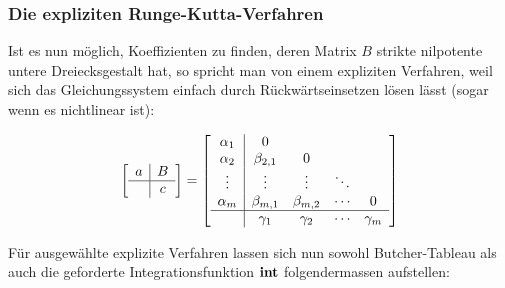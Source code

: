\documentclass[11pt]{report} %
\theoremstyle{definition}
\begin{document}
\subsubsection{Die expliziten Runge-Kutta-Verfahren}

Ist es nun möglich, Koeffizienten zu finden, deren Matrix $B$ strikte nilpotente untere Dreiecksgestalt hat, so spricht man von einem expliziten Verfahren, weil sich das Gleichungssystem einfach durch Rückwärtseinsetzen lösen lässt (sogar wenn es nichtlinear ist):

\[
\begin{bmatrix}
\begin{array}{c|c}
a & B\\
\hline     & c \\
\end{array}
\end{bmatrix} = \begin{bmatrix}
\begin{array}{c|cccc}
  \alpha_1 & 0  \\
  \alpha_2    & \beta_{2,1} & 0\\
  \vdots & \vdots & \vdots& \ddots\\
  \alpha_m    & \beta_{m,1} & \beta_{m,2}& \cdots & 0\\
  \hline & \gamma_1    & \gamma_2   & \cdots & \gamma_m\\
\end{array}

\end{bmatrix}
\]

Für ausgewählte explizite Verfahren lassen sich nun sowohl Butcher-Tableau als auch die geforderte Integrationsfunktion $\mathbf{int}$ folgendermassen aufstellen:
\end{document}
